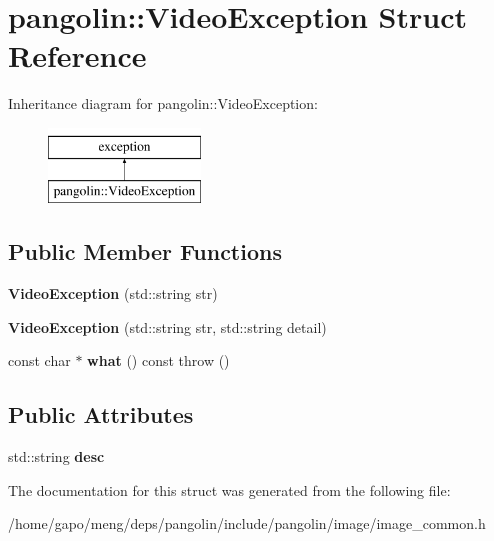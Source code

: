 \hypertarget{structpangolin_1_1_video_exception}{}\section{pangolin\+:\+:Video\+Exception Struct Reference}
\label{structpangolin_1_1_video_exception}
Inheritance diagram for pangolin\+:\+:Video\+Exception\+:\begin{figure}[H]
\begin{center}
\leavevmode
\includegraphics[height=2.000000cm]{structpangolin_1_1_video_exception}
\end{center}
\end{figure}
\subsection*{Public Member Functions}
\begin{DoxyCompactItemize}
\item 
{\bfseries Video\+Exception} (std\+::string str)\hypertarget{structpangolin_1_1_video_exception_a9ae75dae0a57d83456826f31aaa7e32b}{}\label{structpangolin_1_1_video_exception_a9ae75dae0a57d83456826f31aaa7e32b}

\item 
{\bfseries Video\+Exception} (std\+::string str, std\+::string detail)\hypertarget{structpangolin_1_1_video_exception_adcdff665b1d36bab733dc1a5e14c829a}{}\label{structpangolin_1_1_video_exception_adcdff665b1d36bab733dc1a5e14c829a}

\item 
const char $\ast$ {\bfseries what} () const   throw ()\hypertarget{structpangolin_1_1_video_exception_a23212d26b7ab18086332761c00a5e7ca}{}\label{structpangolin_1_1_video_exception_a23212d26b7ab18086332761c00a5e7ca}

\end{DoxyCompactItemize}
\subsection*{Public Attributes}
\begin{DoxyCompactItemize}
\item 
std\+::string {\bfseries desc}\hypertarget{structpangolin_1_1_video_exception_aa2b374f18611aefb8a106e830a039153}{}\label{structpangolin_1_1_video_exception_aa2b374f18611aefb8a106e830a039153}

\end{DoxyCompactItemize}


The documentation for this struct was generated from the following file\+:\begin{DoxyCompactItemize}
\item 
/home/gapo/meng/deps/pangolin/include/pangolin/image/image\+\_\+common.\+h\end{DoxyCompactItemize}
